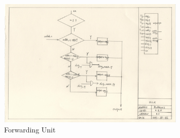 \begin{figure}[Ht]
    \centering
    \includegraphics[width=0.8\textwidth]{fig/fwd.jpg}
    \caption{Forwarding Unit}
    \label{fig:fwd}
\end{figure}

